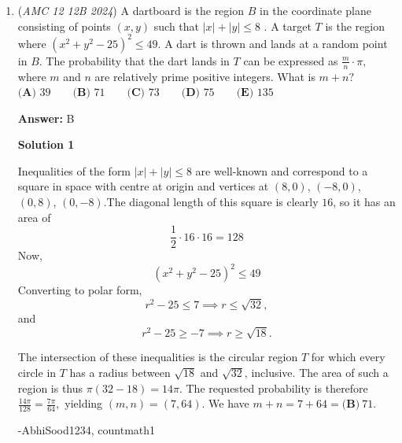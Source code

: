 \begin{enumerate}
Prime factorize all the options to get

 A) $5^2$

 B) $2^5$

 C) $2^2 3^2$

 D) $2\cdot 3\cdot 7$

 E) $2^4 3$

 Since the LHS of the equation 

 
 \[\frac{\log_2x\cdot\log_3x}{\log_2x+\log_3x}=2\]

 is symmetric in 2 and 3 we can guess that the answer has equal powers of 2 and 3 to get $\boxed{\textbf{(C) }36}.$. (Note: you can verify this quickly by changing all the logs base 3 to logs base 2 or vice versa) ~GoldemGem4848

 


	\item (\textit{AMC 12 12B 2024}) A dartboard is the region $B$ in the coordinate plane consisting of points $(x,y)$ such that $|x| + |y| \le 8$ . A target $T$ is the region where $(x^2 + y^2 - 25)^2 \le 49.$ A dart is thrown and lands at a random point in $B$. The probability that the dart lands in $T$ can be expressed as $\frac{m}{n} \cdot \pi,$ where $m$ and $n$ are relatively prime positive integers. What is $m + n?$
$\textbf{(A) }39 \qquad \textbf{(B) }71 \qquad \textbf{(C) }73 \qquad \textbf{(D) }75 \qquad \textbf{(E) }135 \qquad$

 \textbf{Answer: }B



\textbf{Solution 1}

Inequalities of the form $|x|+|y| \le 8$ are well-known and correspond to a square in space with centre at origin and vertices at $(8, 0)$, $(-8, 0)$, $(0, 8)$, $(0, -8)$.The diagonal length of this square is clearly $16$, so it has an area of 
 \[\frac{1}{2} \cdot 16 \cdot 16 = 128\]Now,
 \[(x^2 + y^2 - 25)^2 \le 49\]Converting to polar form,
 \[r^2 - 25 \le 7 \implies r \le \sqrt{32},\]and
 \[r^2 - 25 \ge -7\implies r\ge \sqrt{18}.\]

 The intersection of these inequalities is the circular region $T$ for which every circle in $T$ has a radius between $\sqrt{18}$ and $\sqrt{32}$, inclusive. The area of such a region is thus $\pi(32-18)=14\pi.$ The requested probability is therefore $\frac{14\pi}{128} = \frac{7\pi}{64},$ yielding $(m,n)=(7,64).$ We have $m+n=7+64=\boxed{\textbf{(B)}\ 71}.$

 -AbhiSood1234, countmath1

 




\end{enumerate}
